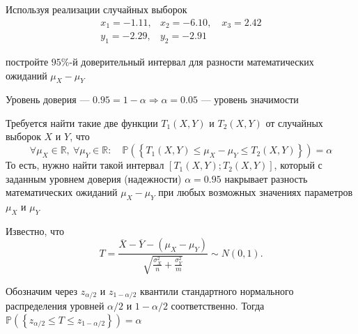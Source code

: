 \documentclass{article}
\begin{document}
Используя реализации случайных выборок
\begin{equation*}
    \begin{array}{ll}
        x_{1}=-1.11, & x_{2}=-6.10, \quad x_{3}=2.42 \\
        y_{1}=-2.29, & y_{2}=-2.91
        \end{array}
\end{equation*}

постройте $95 \%$-й доверительный интервал для разности математических ожиданий $\mu_{X}-\mu_{Y}$

Уровень доверия — $0.95=1-\alpha\Longrightarrow\alpha=0.05$ — уровень значимости%

Требуется найти такие две функции $T_{1}(X, Y)$ и $T_{2}(X, Y)$ от случайных выборок $X$ и $Y$, что
\begin{equation*}
    \forall \mu_{X} \in \mathbb{R},\ \forall \mu_{Y} \in \mathbb{R}: \quad \mathbb{P}\left(\left\{T_{1}(X, Y) \leqslant \mu_{X}-\mu_{Y} \leqslant T_{2}(X, Y)\right\}\right)=\alpha
\end{equation*}
То есть, нужно найти такой интервал $\left[T_{1}(X, Y) ; T_{2}(X, Y)\right]$, который с заданным уровнем доверия (надежности) $\alpha=0.95$ накрывает разность математических ожиданий $\mu_{X}-\mu_{Y}$ при любых возможных значениях параметров $\mu_{X}$ и $\mu_{Y}$

Известно, что
$$
T=\frac{\overline{X}-\overline{Y}-\left(\mu_{X}-\mu_{Y}\right)}{\sqrt{\frac{\sigma_{X}^{2}}{n}+\frac{\sigma_{Y}^{2}}{m}}} \sim N(0,1) .
$$

Обозначим через $z_{\alpha / 2}$ и $z_{1-\alpha / 2}$ квантили стандартного нормального распределения уровней $\alpha / 2$ и $1-\alpha / 2$ соответственно. Тогда $\mathbb{P}\left(\left\{z_{\alpha / 2} \leqslant T \leqslant z_{1-\alpha / 2}\right\}\right)=\alpha$
\end{document}

